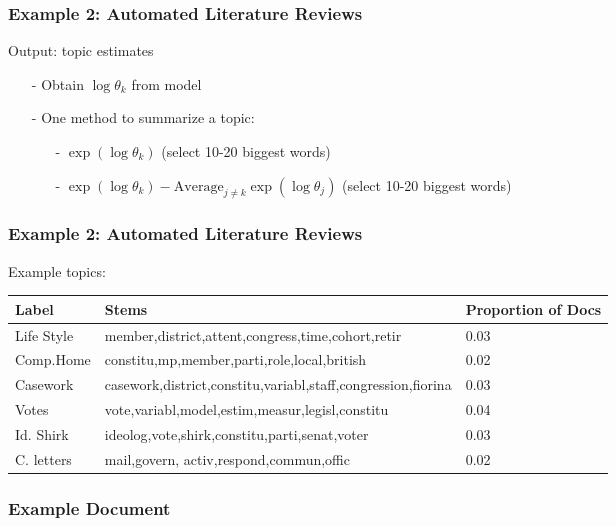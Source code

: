 \documentclass{beamer}
\numberwithin{equation}{section}
\begin{document}
\begin{frame}
\frametitle{Example 2: Automated Literature Reviews}

Output: topic estimates
\begin{itemize}
\item[-] Obtain $\log \theta_k$ from model
\item[-] One method to summarize a topic:
\begin{itemize}
\item[-] $\exp(\log \theta_k) $ (select 10-20 biggest words)
\item[-] $\exp(\log \theta_k) - \text{Average}_{j\neq k} \exp(\log \theta_j)$ (select 10-20 biggest words)
\end{itemize}
\end{itemize}


\end{frame}

\begin{frame}
\frametitle{Example 2: Automated Literature Reviews}
Example topics:
\small
\begin{tabular}{lll}
\hline\hline
Label & Stems & Proportion of Docs \\
\hline
Life Style & member,district,attent,congress,time,cohort,retir & 0.03  \\
Comp.Home & constitu,mp,member,parti,role,local,british &  0.02  \\
Casework & casework,district,constitu,variabl,staff,congression,fiorina & 0.03\\
Votes & vote,variabl,model,estim,measur,legisl,constitu & 0.04 \\
Id. Shirk & ideolog,vote,shirk,constitu,parti,senat,voter & 0.03\\
C. letters & mail,govern, activ,respond,commun,offic &  0.02\\
\hline
\hline
\end{tabular}


\end{frame}

\begin{frame}
\frametitle{Example Document}




\end{frame}
\end{document}
